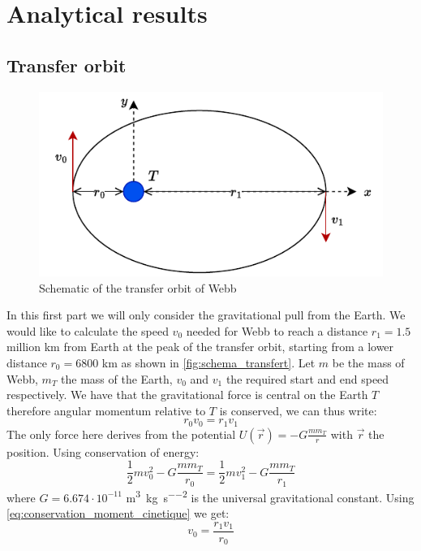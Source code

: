 \section{Analytical results}

\subsection{Transfer orbit}
\label{sec:transfer_anal}

\begin{figure}[h]
    \centering
    \includegraphics[width=0.6\linewidth]{figures/transfert.pdf}
    \caption{Schematic of the transfer orbit of Webb}
    \label{fig:schema_transfert}
\end{figure}
In this first part we will only consider the gravitational pull from the Earth. We would like to calculate the speed $v_0$ needed for Webb to reach a distance \(r_1 = 1.5\) million km from Earth at the peak of the transfer orbit, starting from a lower distance \(r_0 = 6800\) km as shown in \autoref{fig:schema_transfert}. Let \(m\) be the mass of Webb, \(m_T\) the mass of the Earth, \(v_0\) and \(v_1\) the required start and end speed respectively. We have that the gravitational force is central on the Earth $T$ therefore angular momentum relative to $T$ is conserved, we can thus write:
\begin{equation}
    r_0 v_0 = r_1 v_1
    \label{eq:conservation_moment_cinetique}
\end{equation}
The only force here derives from the potential $U(\vec{r}) = -G \frac{m m_T}{r}$ with $\vec{r}$ the position. Using conservation of energy:
\begin{equation}
    \frac{1}{2} m v_0^2 - G \frac{m m_T}{r_0} = \frac{1}{2} m v_1^2 - G \frac{m m_T}{r_1}
    \label{eq:conservation_energy}
\end{equation}
where \(G = 6.674 \cdot 10^{-11}\) \si{\meter\cubed\per\kilo\gram\per\second\squared} is the universal gravitational constant. Using \autoref{eq:conservation_moment_cinetique} we get:
\begin{equation}
    v_0 = \frac{r_1 v_1}{r_0}
    \label{eq:v0_substitution}
\end{equation}
